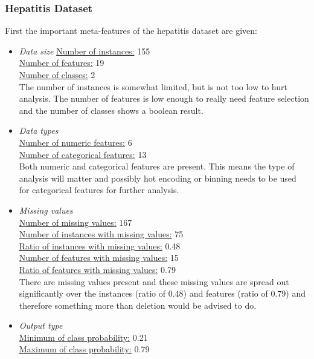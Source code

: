 \documentclass[10pt,a4paper]{article}
\begin{document}
	\subsubsection{Hepatitis Dataset}
	\label{subsec:ExistingResultHepatitis}
	
	First the important meta-features of the hepatitis dataset are given:
	
	\begin{itemize}
		\item \textit{Data size}
		\underline{Number of instances:} 155 \\
		\underline{Number of features:} 19\\
		\underline{Number of classes:} 2\\
		
		The number of instances is somewhat limited, but is not too low to hurt analysis. The number of features is low enough to really need feature selection and the number of classes shows a boolean result.
		
		\item \textit{Data types} \\
		\underline{Number of numeric features:} 6 \\
		\underline{Number of categorical features:} 13 \\
		
		Both numeric and categorical features are present. This means the type of analysis will matter and possibly hot encoding or binning needs to be used for categorical features for further analysis.
		
		\item \textit{Missing values} \\
		\underline{Number of missing values:} 167 \\
		\underline{Number of instances with missing values:} 75 \\
		\underline{Ratio of instances with missing values:} 0.48 \\
		\underline{Number of features with missing values:} 15 \\
		\underline{Ratio of features with missing values:} 0.79 \\
		
		There are missing values present and these missing values are spread out significantly over the instances (ratio of $0.48$) and features (ratio of $0.79$) and therefore something more than deletion would be advised to do.
		
		\item \textit{Output type} \\
		\underline{Minimum of class probability:} 0.21 \\
		\underline{Maximum of class probability:} 0.79 \\
		

\end{itemize}
\end{document}
